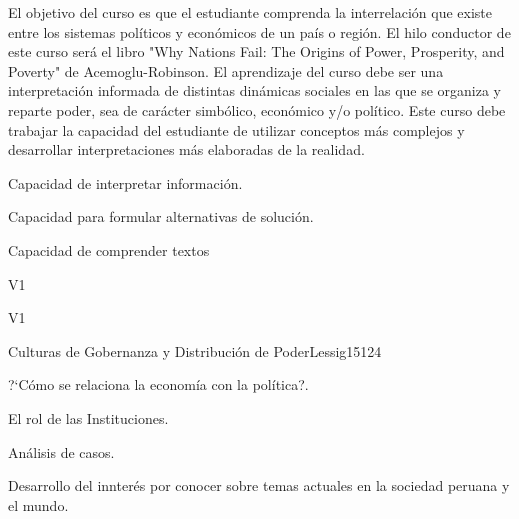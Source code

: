 \begin{syllabus}


\begin{justification}
El objetivo del curso es que el estudiante comprenda la interrelación que existe entre los sistemas políticos y económicos de un país o región. El hilo conductor de este curso será el libro "Why Nations Fail: The Origins of Power, Prosperity, and Poverty" de Acemoglu-Robinson. El aprendizaje del curso debe ser una interpretación informada de distintas dinámicas sociales en las que se organiza y reparte poder, sea de carácter simbólico, económico y/o político.  
Este curso debe trabajar la capacidad del estudiante de utilizar conceptos más complejos y desarrollar interpretaciones más elaboradas de la realidad.
\end{justification}

\begin{goals}
\item Capacidad de interpretar información.
\item Capacidad para formular alternativas de solución.
\item Capacidad de comprender textos
\end{goals}

\begin{outcomes}{V1}
    \item {}
    \item {}
    \item {}
    
\end{outcomes}

\begin{competences}{V1}
    \item {}
    \item {}
    \item {}
    \item {}
\end{competences}

\begin{unit}{Culturas de Gobernanza y Distribución de Poder}{}{Lessig15}{12}{4}
   \begin{topics}
      \item ?`Cómo se relaciona la economía con la política?.
      \item El rol de las Instituciones.
      \item Análisis de casos.
   \end{topics}
   \begin{learningoutcomes}
      \item Desarrollo del innterés por conocer sobre temas actuales en la sociedad peruana y el mundo.
   \end{learningoutcomes}
\end{unit}

\begin{coursebibliography}
\end{coursebibliography}

\end{syllabus}

